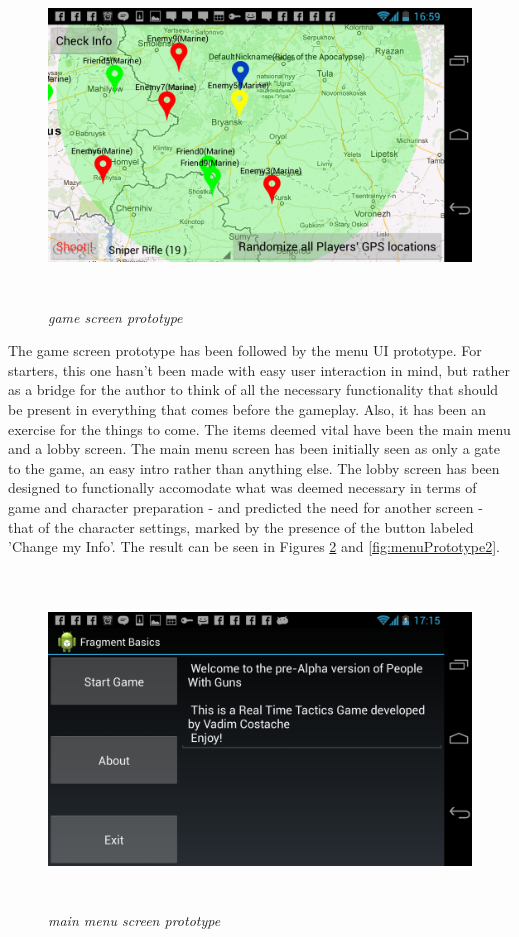 \documentclass{article}
\begin{document}
\begin{figure}
\includegraphics[height=3.5in,width=6.23in]{./images/android_screenshots/ui_prototype/UI_prototype_5.png}  
\caption{\small \sl game screen prototype \label{fig:UIPrototype5}}
\end{figure}


The game screen prototype has been followed by the menu UI prototype. For
starters, this one hasn't been made with easy user interaction in mind, but
rather as a bridge for the author to think of all the necessary functionality
that should be present in everything that comes before the gameplay. Also, it
has been an exercise for the things to come. The items deemed vital have been
the main menu and a lobby screen. The main menu screen has been initially seen
as only a gate to the game, an easy intro rather than anything else. The lobby
screen has been designed to functionally accomodate what was deemed necessary in
terms of game and character preparation - and predicted the need for another
screen - that of the character settings, marked by the presence of the button
labeled 'Change my Info'. The result can be seen in Figures
\ref{fig:menuPrototype1} and \ref{fig:menuPrototype2}.

\begin{figure}
\includegraphics[height=3.5in,width=6.23in]{./images/android_screenshots/menu_prototype/MENU_prototype_1.png}  
\caption{\small \sl main menu screen prototype \label{fig:menuPrototype1}}
\end{figure}
\end{document}
